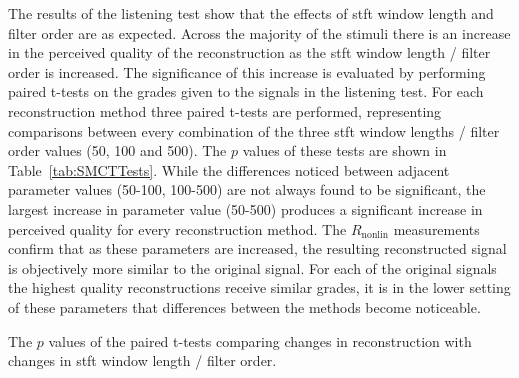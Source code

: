 %
%
		The results of the listening test show that the effects of \acrshort{stft} window length and filter order
		are as expected. Across the majority of the stimuli there is an increase in the perceived quality of the
		reconstruction as the \acrshort{stft} window length / filter order is increased. The significance of this
		increase is evaluated by performing paired t-tests on the grades given to the signals in the listening
		test. For each reconstruction method three paired t-tests are performed, representing comparisons between
		every combination of the three \acrshort{stft} window lengths / filter order values (50, 100 and 500). The
		$p$ values of these tests are shown in Table~\ref{tab:SMCTTests}. While the differences noticed between
		adjacent parameter values (50-100, 100-500) are not always found to be significant, the largest increase in
		parameter value (50-500) produces a significant increase in perceived quality for every reconstruction
		method. The $R_{\mathrm{nonlin}}$ measurements confirm that as these parameters are increased, the
		resulting reconstructed signal is objectively more similar to the original signal. For each of the original
		signals the highest quality reconstructions receive similar grades, it is in the lower setting of these
		parameters that differences between the methods become noticeable.

		\begin{table}[h!]
			\centering
			
			\caption{The $p$ values of the paired t-tests comparing changes in reconstruction
				 with changes in \acrshort{stft} window length
				 / filter order.}
			\label{tab:SMCTTests}
		\end{table}

